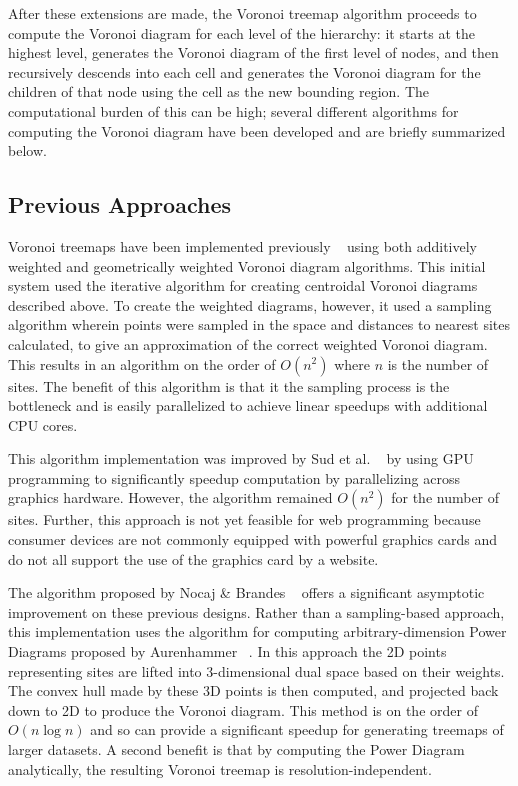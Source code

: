 \documentclass{acm_proc_article-sp} \usepackage{cite}
\begin{document}
After these extensions are made, the Voronoi treemap algorithm
proceeds to compute the Voronoi diagram for each level of the
hierarchy: it starts at the highest level, generates the Voronoi
diagram of the first level of nodes, and then recursively descends
into each cell and generates the Voronoi diagram for the children of
that node using the cell as the new bounding region. The computational
burden of this can be high; several different algorithms for computing
the Voronoi diagram have been developed and are briefly summarized
below.

\subsection{Previous Approaches}
Voronoi treemaps have been implemented previously
~\cite{balzer:treemaps} using both additively weighted and
geometrically weighted Voronoi diagram algorithms. This initial system
used the iterative algorithm for creating centroidal Voronoi
diagrams described above. To create the weighted diagrams, however, it
used a sampling algorithm wherein points were sampled in the space and
distances to nearest sites calculated, to give an approximation of the
correct weighted Voronoi diagram. This results in an algorithm on the
order of $O(n^2)$ where $n$ is the number of sites. The benefit of
this algorithm is that it the sampling process is the bottleneck and
is easily parallelized to achieve linear speedups with additional CPU
cores.

This algorithm implementation was improved by Sud et
al. ~\cite{sud:fast} by using GPU programming to significantly speedup
computation by parallelizing across graphics hardware. However, the
algorithm remained $O(n^2)$ for the number of sites. Further, this
approach is not yet feasible for web programming because consumer devices
are not commonly equipped with powerful graphics cards and do not all
support the use of the graphics card by a website.

The algorithm proposed by Nocaj \& Brandes ~\cite{nocaj:faster} offers
a significant asymptotic improvement on these previous designs. Rather
than a sampling-based approach, this implementation uses the algorithm
for computing arbitrary-dimension Power Diagrams proposed by
Aurenhammer ~\cite{aurenhammer:power}. In this approach the 2D points
representing sites are lifted into 3-dimensional dual space based on
their weights. The convex hull made by these 3D points is then
computed, and projected back down to 2D to produce the Voronoi
diagram. This method is on the order of $O(n \log n)$ and so can
provide a significant speedup for generating treemaps of larger
datasets. A second benefit is that by computing the Power Diagram analytically,
the resulting Voronoi treemap is resolution-independent.
\end{document}
